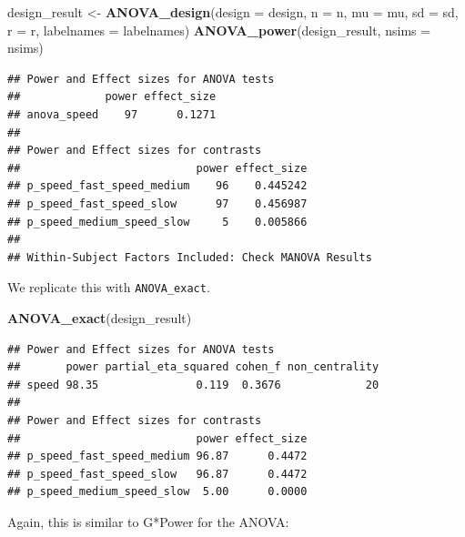 \documentclass[]{book}
\newenvironment{Shaded}{\begin{snugshade}}{\end{snugshade}}
\newcommand{\DataTypeTok}[1]{\textcolor[rgb]{0.13,0.29,0.53}{#1}}
\newcommand{\KeywordTok}[1]{\textcolor[rgb]{0.13,0.29,0.53}{\textbf{#1}}}
\newcommand{\NormalTok}[1]{#1}
\newcommand{\StringTok}[1]{\textcolor[rgb]{0.31,0.60,0.02}{#1}}
\begin{document}
\begin{Shaded}
\begin{Highlighting}[]
\NormalTok{design_result <-}\StringTok{ }\KeywordTok{ANOVA_design}\NormalTok{(}\DataTypeTok{design =}\NormalTok{ design,}
                   \DataTypeTok{n =}\NormalTok{ n, }
                   \DataTypeTok{mu =}\NormalTok{ mu, }
                   \DataTypeTok{sd =}\NormalTok{ sd, }
                   \DataTypeTok{r =}\NormalTok{ r, }
                   \DataTypeTok{labelnames =}\NormalTok{ labelnames)}
\KeywordTok{ANOVA_power}\NormalTok{(design_result, }\DataTypeTok{nsims =}\NormalTok{ nsims)}
\end{Highlighting}
\end{Shaded}

\begin{verbatim}
## Power and Effect sizes for ANOVA tests
##             power effect_size
## anova_speed    97      0.1271
## 
## Power and Effect sizes for contrasts
##                           power effect_size
## p_speed_fast_speed_medium    96    0.445242
## p_speed_fast_speed_slow      97    0.456987
## p_speed_medium_speed_slow     5    0.005866
## 
## Within-Subject Factors Included: Check MANOVA Results
\end{verbatim}

We replicate this with \texttt{ANOVA\_exact}.

\begin{Shaded}
\begin{Highlighting}[]
\KeywordTok{ANOVA_exact}\NormalTok{(design_result)}
\end{Highlighting}
\end{Shaded}

\begin{verbatim}
## Power and Effect sizes for ANOVA tests
##       power partial_eta_squared cohen_f non_centrality
## speed 98.35               0.119  0.3676             20
## 
## Power and Effect sizes for contrasts
##                           power effect_size
## p_speed_fast_speed_medium 96.87      0.4472
## p_speed_fast_speed_slow   96.87      0.4472
## p_speed_medium_speed_slow  5.00      0.0000
\end{verbatim}

Again, this is similar to G*Power for the ANOVA:
\end{document}
